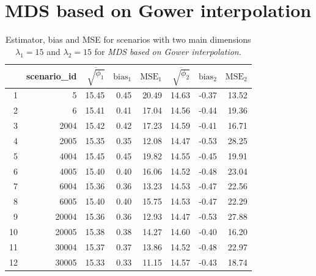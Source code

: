 \documentclass[11pt]{report}
\begin{document}
\section{MDS based on Gower interpolation}
\label{mse_gower}
\begin{table}[ht]
\centering
\begin{tabular}{rrrrrrrr}
  & scenario\_id & $\overline{\sqrt{\phi_1}}$ & $\mbox{bias}_1$ & $\mbox{MSE}_1$ & $\overline{\sqrt{\phi_2}}$ & $\mbox{bias}_2$ & $\mbox{MSE}_2$ \\ 
  \hline
  1 & 5 & 15.45 & 0.45 & 20.49 & 14.63 & -0.37 & 13.52 \\ 
  2 & 6 & 15.41 & 0.41 & 17.04 & 14.56 & -0.44 & 19.36 \\ 
  3 & 2004 & 15.42 & 0.42 & 17.23 & 14.59 & -0.41 & 16.71 \\ 
  4 & 2005 & 15.35 & 0.35 & 12.08 & 14.47 & -0.53 & 28.25 \\ 
  5 & 4004 & 15.45 & 0.45 & 19.82 & 14.55 & -0.45 & 19.91 \\ 
  6 & 4005 & 15.40 & 0.40 & 16.06 & 14.52 & -0.48 & 23.04 \\ 
  7 & 6004 & 15.36 & 0.36 & 13.23 & 14.53 & -0.47 & 22.56 \\ 
  8 & 6005 & 15.40 & 0.40 & 15.75 & 14.53 & -0.47 & 22.29 \\ 
  9 & 20004 & 15.36 & 0.36 & 12.93 & 14.47 & -0.53 & 27.88 \\ 
  10 & 20005 & 15.38 & 0.38 & 14.27 & 14.60 & -0.40 & 16.20 \\ 
  11 & 30004 & 15.37 & 0.37 & 13.86 & 14.52 & -0.48 & 22.97 \\ 
  12 & 30005 & 15.33 & 0.33 & 11.15 & 14.57 & -0.43 & 18.74 \\ 
   \hline
\end{tabular}
\caption{Estimator, bias and MSE for scenarios with two main dimensions $\lambda_1 = 15$ and $\lambda_2 = 15$ for \textit{MDS based on Gower interpolation}.}
\end{table}
\end{document}
